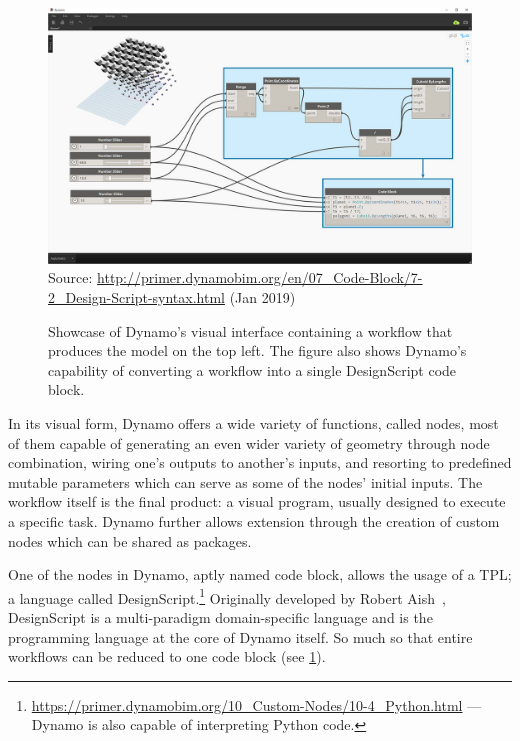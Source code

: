 \begin{figure}[htb]
  \includegraphics[width=\textwidth]{fig/dynamo-node-to-code}\\
  {\scriptsize
  Source: \url{http://primer.dynamobim.org/en/07_Code-Block/7-2_Design-Script-syntax.html}
  (Jan 2019)
  }
  \caption[Dynamo's visual interface with node to code translation]{
    Showcase of Dynamo's visual interface containing a workflow that produces
    the model on the top left.  The figure also shows Dynamo's capability of
    converting a workflow into a single DesignScript code block.}%
  \label{fig:related.ad.dynamo.node2code}
\end{figure}

In its visual form, Dynamo offers a wide variety of functions, called nodes,
most of them capable of generating an even wider variety of geometry through
node combination, wiring one's outputs to another's inputs, and resorting to
predefined mutable parameters which can serve as some of the nodes' initial
inputs.  The workflow itself is the final product: a visual program, usually
designed to execute a specific task.  Dynamo further allows extension through the
creation of custom nodes which can be shared as packages.

One of the nodes in Dynamo, aptly named code block, allows the usage of a
\ac{TPL}; a language called
DesignScript.\footnote{\url{https://primer.dynamobim.org/10_Custom-Nodes/10-4_Python.html}
--- Dynamo is also capable of interpreting Python code.}
Originally developed by Robert Aish~\cite{Aish:2011:DesignScript}, DesignScript
is a multi-paradigm domain-specific language and is the programming language at
the core of Dynamo itself.  So much so that entire workflows can be reduced to
one code block (see \cref{fig:related.ad.dynamo.node2code}).

